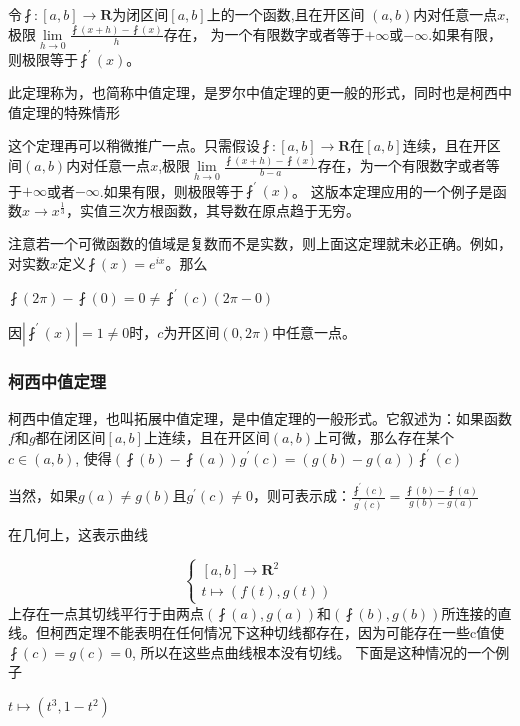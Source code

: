 \documentclass[UTF8]{ctexbook}
\newcommand{\limNormal}[1]{\lim\limits_{#1}}
\newcommand{\derivative}{^\prime}
\newcommand{\fDerivative}[1]{\fint\derivative(#1)}
\newcommand{\defFunction}[1]{\fint(#1)}
\begin{document}
{{{{令$\fint : [a,b] \to \mathbf{R}$为闭区间$[a,b]$上的一个函数,且在开区间
$(a,b)$内对任意一点$x$,极限$\limNormal{h \to 0}\frac{\fint(x + h) - \fint(x)}{h}$存在，
为一个有限数字或者等于$+\infty$或$-\infty$.如果有限，则极限等于$\fDerivative{x}$。

此定理称为{}，也简称中值定理，是罗尔中值定理的更一般的形式，同时也是柯西中值定理的特殊情形

这个定理再可以稍微推广一点。只需假设$\fint : [a,b] \to \mathbf{R}$在$[a,b]$连续，且在开区间$(a,b)$内对任意一点$x$,极限$\limNormal{h \to 0}
  \frac{\defFunction{x + h} - \defFunction{x}}{b - a}$存在，为一个有限数字或者等于$+\infty$或者$-\infty$.如果有限，则极限等于$\fDerivative{x}$。
这版本定理应用的一个例子是函数$x \to x^{\frac{1}{3}}$，实值三次方根函数，其导数在原点趋于无穷。

注意若一个可微函数的值域是复数而不是实数，则上面这定理就未必正确。例如，对实数$x$定义$\defFunction{x} = e^{ix}$。那么

$\defFunction{2\pi} - \defFunction{0} = 0 \neq \fDerivative{c}(2\pi - 0)$

因$|\fDerivative{x}| = 1 \neq 0$时，$c$为开区间$(0,2\pi)$中任意一点。
}%

\subsubsection{柯西中值定理}{
  柯西中值定理，也叫拓展中值定理，是中值定理的一般形式。它叙述为：如果函数$f$和$g$都在闭区间$[a,b]$上连续，且在开区间$(a,b)$上可微，那么存在某个$c \in (a,b)$,
  使得$(\defFunction{b} - \defFunction{a})g\derivative(c) = (g(b)-g(a))\fDerivative{c}$

  当然，如果$g(a) \neq g(b)$且$g\derivative(c) \neq 0$，则可表示成：$\frac{\fDerivative{c}}{g\derivative(c)} = \frac{\defFunction{b} - \defFunction{a}}{g(b) - g(a)}$

  在几何上，这表示曲线

  $$
    \begin{cases}
      [a,b] \to \mathbf{R}^2 \\
      t \mapsto (f(t), g(t))
    \end{cases}
  $$
  上存在一点其切线平行于由两点$(\defFunction{a}, g(a))$和$(\defFunction{b}, g(b))$所连接的直线。但柯西定理不能表明在任何情况下这种切线都存在，因为可能存在一些c值使$\defFunction{c} = g(c) = 0$, 所以在这些点曲线根本没有切线。
  下面是这种情况的一个例子

  $t \mapsto (t^3, 1-t^2)$

}}}}
\end{document}

